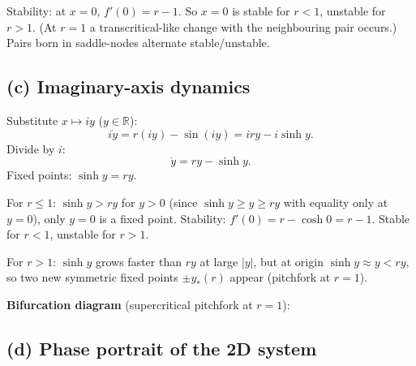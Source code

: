 \documentclass[11pt]{article}
\begin{document}
Stability: at $x=0$, $f'(0) = r - 1$. So $x=0$ is stable for $r<1$, unstable for $r>1$. (At $r=1$ a transcritical-like change with the neighbouring pair occurs.) Pairs born in saddle-nodes alternate stable/unstable.

\subsection*{(c) Imaginary-axis dynamics}

Substitute $x\mapsto iy$ ($y\in\mathbb R$):
\[ i\dot y = r(iy) - \sin(iy) = iry - i\sinh y. \]
Divide by $i$:
\[ \dot y = ry - \sinh y. \]
Fixed points: $\sinh y = ry$.

For $r\le 1$: $\sinh y > ry$ for $y>0$ (since $\sinh y \ge y \ge ry$ with equality only at $y=0$), only $y=0$ is a fixed point. Stability: $f'(0) = r - \cosh 0 = r - 1$. Stable for $r<1$, unstable for $r>1$.

For $r>1$: $\sinh y$ grows faster than $ry$ at large $|y|$, but at origin $\sinh y \approx y < ry$, so two new symmetric fixed points $\pm y_*(r)$ appear (pitchfork at $r=1$).

\textbf{Bifurcation diagram} (supercritical pitchfork at $r=1$):

\begin{center}
\end{center}

\subsection*{(d) Phase portrait of the 2D system}
\end{document}
